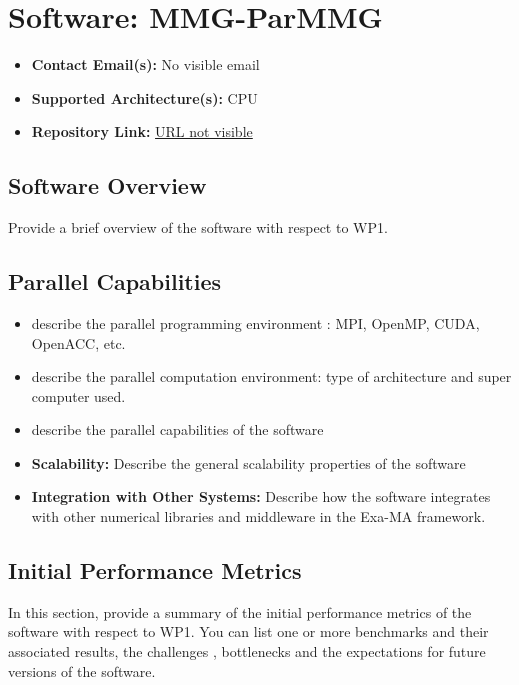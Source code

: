 \section{Software: MMG-ParMMG}
\label{sec:WP1:MMG-ParMMG:software}

\begin{itemize}
    \item \textbf{Contact Email(s):} No visible email
    \item \textbf{Supported Architecture(s):} CPU
    \item \textbf{Repository Link:} \href{URL not visible}{URL not visible}
\end{itemize}

\subsection{Software Overview}
\label{sec:WP1:MMG-ParMMG:summary}

Provide a brief overview of the software with respect to WP1.

\subsection{Parallel Capabilities}
\label{sec:WP1:MMG-ParMMG:performances}


\begin{itemize}
    \item describe the parallel programming  environment : MPI, OpenMP, CUDA, OpenACC, etc.
    \item describe the parallel computation environment: type of architecture and super computer used.
    \item describe the parallel capabilities of the software
    \item \textbf{Scalability:} Describe the general scalability properties of the software
    \item \textbf{Integration with Other Systems:} Describe how the software integrates with other numerical libraries and middleware in the Exa-MA framework.
\end{itemize}

\subsection{Initial Performance Metrics}
\label{sec:WP1:MMG-ParMMG:metrics}

In this section, provide a summary of the initial performance metrics of the software with respect to WP1.
You can list one or more benchmarks and their associated results, the challenges , bottlenecks and the expectations for future versions of the software.



